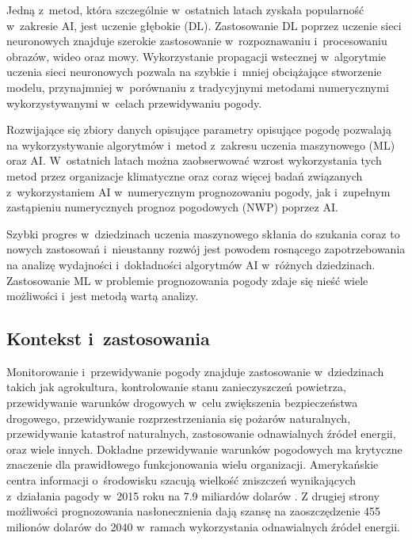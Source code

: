 Jedną z~metod, która szczególnie w~ostatnich latach zyskała popularność w~zakresie
AI, jest uczenie głębokie (DL). Zastosowanie DL poprzez uczenie sieci neuronowych
znajduje szerokie zastosowanie w~rozpoznawaniu i~procesowaniu obrazów, wideo oraz
mowy. Wykorzystanie propagacji wstecznej w~algorytmie uczenia sieci neuronowych
pozwala na szybkie i~mniej obciążające stworzenie modelu, przynajmniej w~porównaniu
z tradycyjnymi metodami numerycznymi wykorzystywanymi w~celach przewidywaniu pogody.

Rozwijające się zbiory danych opisujące parametry opisujące pogodę 
pozwalają na wykorzystywanie algorytmów i~metod z~zakresu uczenia maszynowego (ML)
oraz AI. W~ostatnich latach można zaobserwować wzrost wykorzystania tych metod
przez organizacje klimatyczne oraz coraz więcej badań związanych z~wykorzystaniem
AI w~numerycznym prognozowaniu pogody, jak i~zupełnym zastąpieniu numerycznych
prognoz pogodowych (NWP) poprzez AI.

Szybki progres w~dziedzinach uczenia maszynowego skłania do szukania coraz to nowych
zastosowań i~nieustanny rozwój jest powodem rosnącego zapotrzebowania na analizę
wydajności i~dokładności algorytmów AI w~różnych dziedzinach. Zastosowanie ML w
problemie prognozowania pogody zdaje się nieść wiele możliwości i~jest metodą
wartą analizy. 

\subsection{Kontekst i~zastosowania}

Monitorowanie i~przewidywanie pogody znajduje zastosowanie w~dziedzinach takich
jak agrokultura, kontrolowanie stanu zanieczyszczeń powietrza, 
przewidywanie warunków drogowych w~celu zwiększenia bezpieczeństwa drogowego,
przewidywanie rozprzestrzeniania się pożarów naturalnych,
przewidywanie katastrof naturalnych, zastosowanie odnawialnych źródeł energii,
oraz wiele innych. Dokładne przewidywanie warunków pogodowych ma krytyczne znaczenie
dla prawidłowego funkcjonowania wielu organizacji. Amerykańskie centra
informacji o~środowisku szacują wielkość zniszczeń wynikających z~działania
pagody w~2015 roku na 7.9 miliardów dolarów \cite{using-artificial-intelligence-to-improve}.
Z drugiej strony możliwości prognozowania nasłonecznienia dają szansę na zaoszczędzenie
455 milionów dolarów do 2040 w~ramach wykorzystania odnawialnych źródeł energii.

